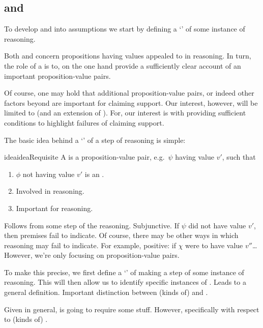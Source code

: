 \subsection{ and }
\label{sec:claim-supp-requ}

\begin{note}
  To develop \ideaCSA{} and \ideaCSB{} into assumptions we start by defining a `\requ{}' of some instance of reasoning.

  Both \ideaCSA{} and \ideaCSB{} concern propositions having values appealed to in reasoning.
  In turn, the role of a \requ{} is to, on the one hand provide a sufficiently clear account of an important proposition-value pairs.

  Of course, one may hold that additional proposition-value pairs, or indeed other factors beyond  are important for claiming support.
  Our interest, however, will be limited to  (and an extension of ).
  For, our interest is with providing sufficient conditions to highlight failures of claiming support.
\end{note}

\begin{note}
  The basic idea behind a `\requ{}' of a step of reasoning is simple:
  \begin{restatable}{idea}{ideaRequisite}
    A \requ{} is a proposition-value pair, e.g.\ \(\psi\) having value \(v'\), such that
    \begin{enumerate}
    \item \(\phi\) not having value \(v'\) is an \ep{}.
    \item Involved in reasoning.
    \item Important for reasoning.
    \end{enumerate}
  \end{restatable}

  Follows from some step of the reasoning.
  Subjunctive.
  If \(\psi\) did not have value \(v'\), then premises fail to indicate.
  Of course, there may be other ways in which reasoning may fail to indicate.
  For example, positive: if \(\chi\) were to have value \(v''\)\dots
  However, we're only focusing on proposition-value pairs.
\end{note}

\begin{note}
  To make this precise, we first define a `\result{}' of making a step of some instance of reasoning.
  This will then allow us to identify specific instances of .
  Leads to a general definition.
  Important distinction between (kinds of)  and .

  Given \requ{} in general, \ideaCSB{} is going to require some stuff.
  However, specifically with respect to (kinds of) .
\end{note}

